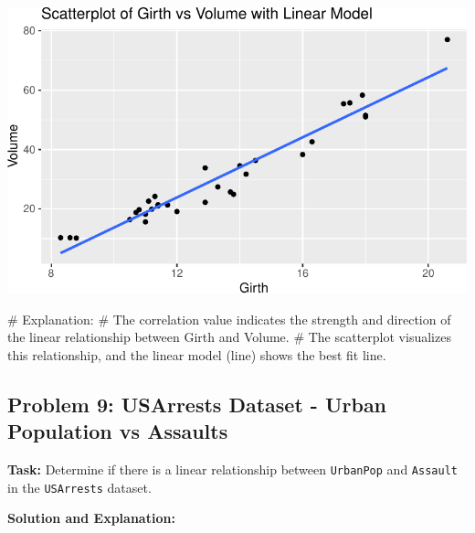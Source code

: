 \documentclass[
  letterpaper,
  DIV=11,
  numbers=noendperiod]{scrreprt}
\newenvironment{Shaded}{\begin{snugshade}}{\end{snugshade}}
\newcommand{\CommentTok}[1]{\textcolor[rgb]{0.37,0.37,0.37}{#1}}
\newcommand{\FunctionTok}[1]{\textcolor[rgb]{0.28,0.35,0.67}{#1}}
\newcommand{\NormalTok}[1]{\textcolor[rgb]{0.00,0.23,0.31}{#1}}
\newcommand{\OtherTok}[1]{\textcolor[rgb]{0.00,0.23,0.31}{#1}}
\newcommand{\SpecialCharTok}[1]{\textcolor[rgb]{0.37,0.37,0.37}{#1}}
\begin{document}
\includegraphics{Linear_Modeling_and_Regression_files/figure-pdf/unnamed-chunk-23-1.pdf}

\begin{Shaded}
\begin{Highlighting}[]
\CommentTok{\# Explanation:}
\CommentTok{\# The correlation value indicates the strength and direction of the linear relationship between Girth and Volume.}
\CommentTok{\# The scatterplot visualizes this relationship, and the linear model (line) shows the best fit line.}
\end{Highlighting}
\end{Shaded}

\subsection*{Problem 9: USArrests Dataset - Urban Population vs
Assaults}\label{problem-9-usarrests-dataset---urban-population-vs-assaults-1}

\textbf{Task:} Determine if there is a linear relationship between
\texttt{UrbanPop} and \texttt{Assault} in the \texttt{USArrests}
dataset.

\textbf{Solution and Explanation:}

\begin{Shaded}
\end{Shaded}
\end{document}
